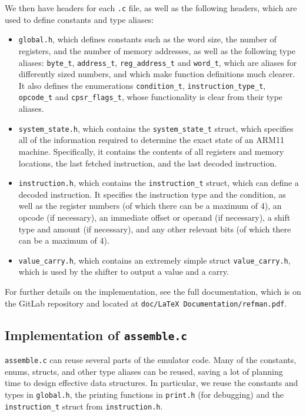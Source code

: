 \documentclass[10pt]{article}
\begin{document}
We then have headers for each \texttt{.c} file, as well as the following headers, which are used to define constants and type aliases:

\begin{itemize}
\item \texttt{global.h}, which defines constants such as the word size, the number of registers, and the number of memory addresses, as well as the following type aliases: \texttt{byte\_t}, \texttt{address\_t}, \texttt{reg\_address\_t} and \texttt{word\_t}, which are aliases for differently sized numbers, and which make function definitions much clearer. It also defines the enumerations \texttt{condition\_t}, \texttt{instruction\_type\_t}, \texttt{opcode\_t} and \texttt{cpsr\_flags\_t}, whose functionality is clear from their type aliases.
\item \texttt{system\_state.h}, which contains the \texttt{system\_state\_t} struct, which specifies all of the information required to determine the exact state of an ARM11 machine. Specifically, it contains the contents of all registers and memory locations, the last fetched instruction, and the last decoded instruction.
\item \texttt{instruction.h}, which contains the \texttt{instruction\_t} struct, which can define a decoded instruction. It specifies the instruction type and the condition, as well as the register numbers (of which there can be a maximum of 4), an opcode (if necessary), an immediate offset or operand (if necessary), a shift type and amount (if necessary), and any other relevant bits (of which there can be a maximum of 4).
\item \texttt{value\_carry.h}, which contains an extremely simple struct \texttt{value\_carry.h}, which is used by the shifter to output a value and a carry.
\end{itemize}

For further details on the implementation, see the full documentation, which is on the GitLab repository and located at \texttt{doc/LaTeX Documentation/refman.pdf}.

\subsection{Implementation of \texttt{assemble.c}}

\texttt{assemble.c} can reuse several parts of the emulator code. Many of the constants, enums, structs, and other type aliases can be reused, saving a lot of planning time to design effective data structures. In particular, we reuse the constants and types in \texttt{global.h}, the printing functions in \texttt{print.h} (for debugging) and the \texttt{instruction\_t} struct from \texttt{instruction.h}.
\end{document}
